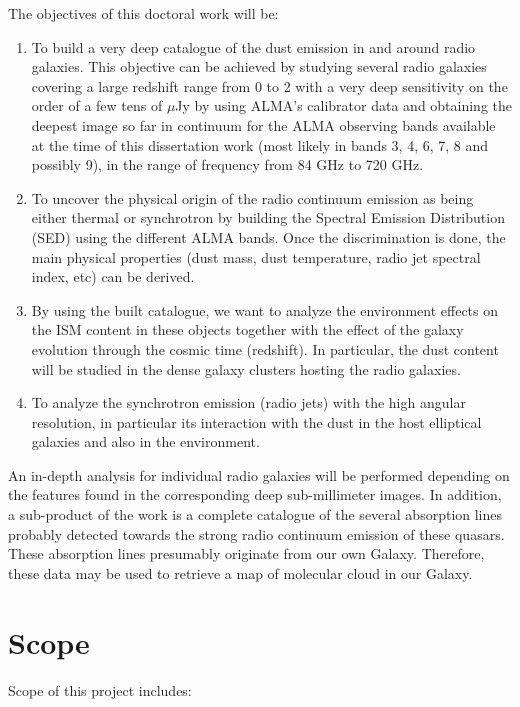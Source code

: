 The objectives of this doctoral work will be:

\begin{enumerate}
\item To build a very deep catalogue of the dust emission in and around radio galaxies. This objective can be achieved by studying several radio galaxies covering a large redshift range from 0 to 2 with a very deep sensitivity on the order of a few tens of $\mu$Jy by using ALMA's calibrator data and obtaining the deepest image so far in continuum for the ALMA observing bands available at the time of this dissertation work (most likely in bands 3, 4, 6, 7, 8 and possibly 9), in the range of frequency from 84 GHz to 720 GHz.  

\item To uncover the physical origin of the radio continuum emission as being either thermal or synchrotron by building the Spectral Emission Distribution (SED) using the different ALMA bands. Once the discrimination is done, the main physical properties (dust mass, dust temperature, radio jet spectral index, etc) can be derived.

\item By using the built catalogue, we want to analyze the environment effects on the ISM content in these objects together with the effect of the galaxy evolution through the cosmic time (redshift). In particular, the dust content will be studied in the dense galaxy clusters hosting  the radio galaxies.

\item To analyze the synchrotron emission (radio jets) with the high angular resolution, in particular its interaction with the dust in the host elliptical galaxies and also in the environment.
\end{enumerate}

An in-depth analysis for individual radio galaxies will be performed depending on the features found in the corresponding deep sub-millimeter images. In addition, a sub-product of the work is a complete catalogue of the several absorption lines probably detected towards the strong radio continuum emission of these quasars.  These absorption lines presumably originate from our own Galaxy. Therefore, these data may be used to retrieve a map of molecular cloud in our Galaxy.

\section{Scope}
Scope of this project includes:

